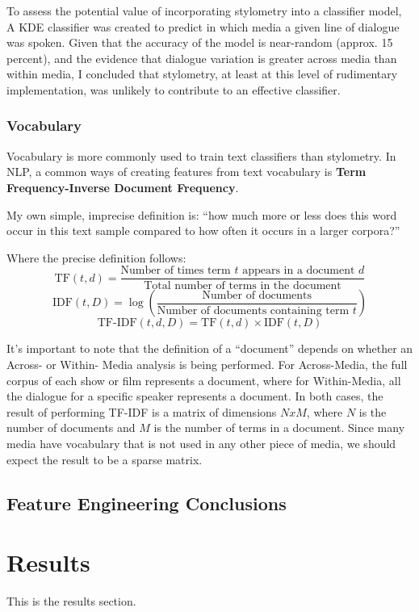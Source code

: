 \documentclass{article}
\begin{document}
\begin{titlepage}
To assess the potential value of incorporating stylometry into a classifier model, A KDE classifier was created to predict in which media a given line of dialogue was spoken. Given that the accuracy of the model is near-random (approx. 15 percent), and the evidence that dialogue variation is greater across media than within media, I concluded that stylometry, at least at this level of rudimentary implementation, was unlikely to contribute to an effective classifier.

\subsubsection{Vocabulary}

Vocabulary is more commonly used to train text classifiers than stylometry. In NLP, a common ways of creating features from text vocabulary is \textbf{Term Frequency-Inverse Document Frequency}.

My own simple, imprecise definition is: ``how much more or less does this word occur in this text sample compared to how often it occurs in a larger corpora?''

Where the precise definition follows:
\[
\text{TF}(t, d) = \frac{\text{Number of times term } t \text{ appears in a document } d}{\text{Total number of terms in the document}}
\]
\[
\text{IDF}(t, D) = \log \left( \frac{\text{Number of documents}}{\text{Number of documents containing term } t} \right)
\]
\[
\text{TF-IDF}(t, d, D) = \text{TF}(t, d) \times \text{IDF}(t, D)
\]

It's important to note that the definition of a ``document'' depends on whether an Across- or Within- Media analysis is being performed. For Across-Media, the full corpus of each show or film represents a document, where for Within-Media, all the dialogue for a specific speaker represents a document. In both cases, the result of performing TF-IDF is a matrix of dimensions $NxM$, where $N$ is the number of documents and $M$ is the number of terms in a document. Since many media have vocabulary that is not used in any other piece of media, we should expect the result to be a sparse matrix.

\subsection{Feature Engineering Conclusions}

\section{Results}
This is the results section.


\end{titlepage}
\end{document}
